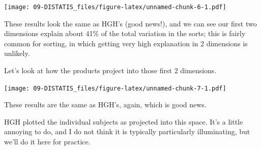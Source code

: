 \documentclass[
]{book}
\newenvironment{Shaded}{\begin{snugshade}}{\end{snugshade}}
\newcommand{\AttributeTok}[1]{\textcolor[rgb]{0.13,0.29,0.53}{#1}}
\newcommand{\DecValTok}[1]{\textcolor[rgb]{0.00,0.00,0.81}{#1}}
\newcommand{\FunctionTok}[1]{\textcolor[rgb]{0.13,0.29,0.53}{\textbf{#1}}}
\newcommand{\NormalTok}[1]{#1}
\newcommand{\OtherTok}[1]{\textcolor[rgb]{0.56,0.35,0.01}{#1}}
\newcommand{\SpecialCharTok}[1]{\textcolor[rgb]{0.81,0.36,0.00}{\textbf{#1}}}
\newcommand{\StringTok}[1]{\textcolor[rgb]{0.31,0.60,0.02}{#1}}
\begin{document}
\texttt{[image: 09-DISTATIS\_files/figure-latex/unnamed-chunk-6-1.pdf]}

These results look the same as HGH's (good news!), and we can see our first two dimensions explain about 41\% of the total variation in the sorts; this is fairly common for sorting, in which getting very high explanation in 2 dimensions is unlikely.

Let's look at how the products project into those first 2 dimensions.

\begin{Shaded}
\end{Shaded}

\texttt{[image: 09-DISTATIS\_files/figure-latex/unnamed-chunk-7-1.pdf]}

These results are the same as HGH's, again, which is good news.

HGH plotted the individual subjects as projected into this space. It's a little annoying to do, and I do not think it is typically particularly illuminating, but we'll do it here for practice.
\end{document}
